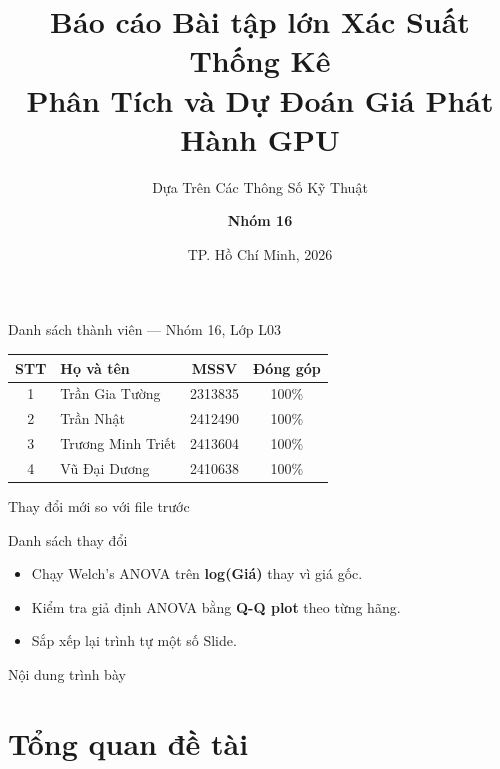 \documentclass[13pt, aspectratio=169]{beamer}
\title[BTL XSTK]{%
  {\normalsize Báo cáo Bài tập lớn Xác Suất Thống Kê}\\[0.4em]
  \textbf{Phân Tích và Dự Đoán Giá Phát Hành GPU}%
}
\subtitle{Dựa Trên Các Thông Số Kỹ Thuật}
\author[Nhóm 16--L03]{
  \textbf{Nhóm 16}
}
\institute[HCMUT]{
  Lớp \textbf{L03} \\[0.2em]
  GVHD: Huỳnh Thái Duy Phương \quad  \\[0.2em]
}
\date[NH 2025--2026]{TP. Hồ Chí Minh, 2026}
\newcommand{\hl}[1]{\textcolor{red!75!black}{\textbf{#1}}}
\begin{document}

\frame{\titlepage}

\begin{frame}{Danh sách thành viên --- Nhóm 16, Lớp L03}
  \centering
  \renewcommand{\arraystretch}{1.5}
  \begin{tabular}{clcc}
    \toprule
    \textbf{STT} & \textbf{Họ và tên} & \textbf{MSSV} & \textbf{Đóng góp} \\
    \midrule
    1 & Trần Gia Tường & 2313835 & 100\% \\
    2 & Trần Nhật      & 2412490 & 100\% \\
    3 & Trương Minh Triết & 2413604 & 100\% \\
    4 & Vũ Đại Dương   & 2410638 & 100\% \\
    \bottomrule
  \end{tabular}
  \vspace{0.8em}
\end{frame}


\begin{frame}{Thay đổi mới so với file trước}
  \begin{block}{Danh sách thay đổi}
    \footnotesize
    \begin{itemize}
      \item Chạy Welch's ANOVA trên \hl{log(Giá)} thay vì giá gốc.
      \item Kiểm tra giả định ANOVA bằng \hl{Q-Q plot} theo từng hãng.
      \item Sắp xếp lại trình tự một số Slide.
    \end{itemize}
  \end{block}
\end{frame}

\begin{frame}{Nội dung trình bày}
  \tableofcontents
\end{frame}

\section{Tổng quan đề tài}
\end{document}
